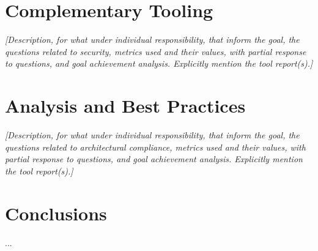 \documentclass[a4paper,11pt,openright,BCOR=15mm]{scrbook}
\begin{document}
	\chapter{Complementary Tooling}
\textit{	[Description, for what under individual responsibility, that inform the goal, the questions related to security, metrics used and their values, with partial response to questions, and goal achievement analysis. Explicitly mention the tool report(s).]}
		
	\chapter{Analysis and Best Practices}
 \textit{	[Description, for what under individual responsibility, that inform the goal, the questions related to architectural compliance, metrics used and their values, with partial response to questions, and goal achievement analysis. Explicitly mention the tool report(s).]}
	


	\chapter{Conclusions }
 ...\newline



%	
%	
%	
	
	\printbibliography[heading=bibintoc]
	
	
\end{document}
